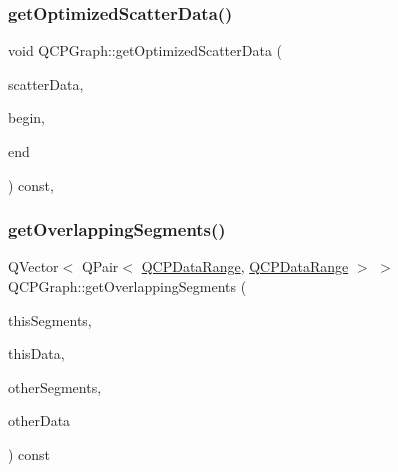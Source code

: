 \subsubsection{\texorpdfstring{get\+Optimized\+Scatter\+Data()}{getOptimizedScatterData()}}
{\footnotesize\ttfamily void Q\+C\+P\+Graph\+::get\+Optimized\+Scatter\+Data (\begin{DoxyParamCaption}\item[{Q\+Vector$<$ \hyperlink{class_q_c_p_graph_data}{Q\+C\+P\+Graph\+Data} $>$ $\ast$}]{scatter\+Data,  }\item[{\hyperlink{class_q_c_p_data_container_ae40a91f5cb0bcac61d727427449b7d15}{Q\+C\+P\+Graph\+Data\+Container\+::const\+\_\+iterator}}]{begin,  }\item[{\hyperlink{class_q_c_p_data_container_ae40a91f5cb0bcac61d727427449b7d15}{Q\+C\+P\+Graph\+Data\+Container\+::const\+\_\+iterator}}]{end }\end{DoxyParamCaption}) const\hspace{0.3cm}{\ttfamily [protected]}, {\ttfamily [virtual]}}

\mbox{\label{class_q_c_p_graph_a334b15c43ee1855bf724daf886e8530e}} 
\subsubsection{\texorpdfstring{get\+Overlapping\+Segments()}{getOverlappingSegments()}}
{\footnotesize\ttfamily Q\+Vector$<$ Q\+Pair$<$ \hyperlink{class_q_c_p_data_range}{Q\+C\+P\+Data\+Range}, \hyperlink{class_q_c_p_data_range}{Q\+C\+P\+Data\+Range} $>$ $>$ Q\+C\+P\+Graph\+::get\+Overlapping\+Segments (\begin{DoxyParamCaption}\item[{Q\+Vector$<$ \hyperlink{class_q_c_p_data_range}{Q\+C\+P\+Data\+Range} $>$}]{this\+Segments,  }\item[{const Q\+Vector$<$ Q\+PointF $>$ $\ast$}]{this\+Data,  }\item[{Q\+Vector$<$ \hyperlink{class_q_c_p_data_range}{Q\+C\+P\+Data\+Range} $>$}]{other\+Segments,  }\item[{const Q\+Vector$<$ Q\+PointF $>$ $\ast$}]{other\+Data }\end{DoxyParamCaption}) const\hspace{0.3cm}{\ttfamily [protected]}}


